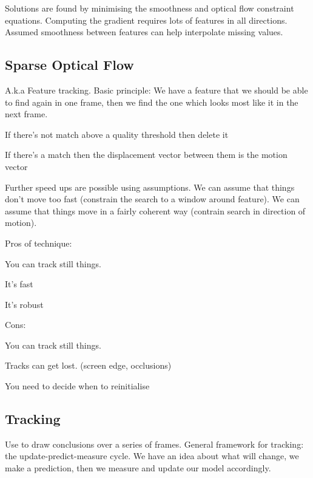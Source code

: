 \documentclass[8pt]{extarticle}
\begin{document}
\begin{multicols}{2}
Solutions are found by minimising the smoothness and optical flow constraint equations. Computing the gradient requires lots of features in all directions. Assumed smoothness between features can help interpolate missing values.

\subsection{Sparse Optical Flow}
A.k.a Feature tracking. Basic principle: We have a feature that we should be able to find again in one frame, then we find the one which looks most like it in the next frame.

\begin{compactitem}
    \item If there's not match above a quality threshold then delete it
    \item If there's a match then the displacement vector between them is the motion vector
\end{compactitem}

Further speed ups are possible using assumptions. We can assume that things don't move too fast (constrain the search to a window around feature). We can assume that things move in a fairly coherent way (contrain search in direction of motion).

Pros of technique:
\begin{compactitem}
    \item You can track still things.
    \item It's fast
    \item It's robust
\end{compactitem}

Cons:
\begin{compactitem}
    \item You can track still things.
    \item Tracks can get lost. (screen edge, occlusions)
    \item You need to decide when to reinitialise
\end{compactitem}

\subsection{Tracking}
Use to draw conclusions over a series of frames. General framework for tracking: the update-predict-measure cycle. We have an idea about what will change, we make a prediction, then we measure and update our model accordingly.


\end{multicols}
\end{document}
